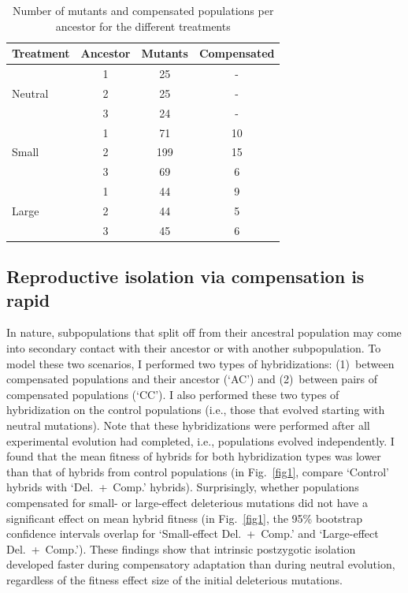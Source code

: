 \begin{doublespace}
\begin{table}
\centering
\begin{tabular}{lccc}
Treatment & Ancestor & Mutants & Compensated \\
\hline
        & 1 & 25 & - \\
Neutral & 2 & 25 & - \\
        & 3 & 24 & - \\
\hline
        & 1 & 71  & 10 \\
Small   & 2 & 199 & 15 \\
        & 3 & 69  & 6  \\
\hline
        & 1 & 44  & 9 \\
Large   & 2 & 44  & 5 \\
        & 3 & 45  & 6 \\
\hline
\end{tabular}
\caption{Number of mutants and compensated populations per ancestor for
  the different treatments}
\label{tbl1}
\end{table}



\subsection{Reproductive isolation via compensation is rapid}

In nature, subpopulations that split off from their ancestral population may
come into secondary contact with their ancestor or with another subpopulation.
%
To model these two scenarios, I performed two types of hybridizations:
(1)~between compensated populations and their ancestor (`AC')
and (2)~between pairs of compensated populations (`CC').
%
I also performed these two types of hybridization on the control populations
(i.e., those that evolved starting with neutral mutations).
%
Note that these hybridizations were performed after all experimental evolution
had completed, i.e., populations evolved independently.
%
I found that the mean fitness of hybrids for both hybridization types
was lower than that of hybrids from control populations
(in Fig.~\ref{fig1}, compare `Control' hybrids with `Del.~+~Comp.' hybrids).
%
Surprisingly, whether populations compensated for
small- or large-effect deleterious mutations
did not have a significant effect on mean hybrid fitness
(in Fig.~\ref{fig1}, the 95\% bootstrap confidence intervals overlap for
`Small-effect Del.~+~Comp.' and `Large-effect Del.~+~Comp.').
%
These findings show that intrinsic postzygotic isolation developed faster
during compensatory adaptation than during neutral evolution,
regardless of the fitness effect size of the initial deleterious mutations.




\end{doublespace}
